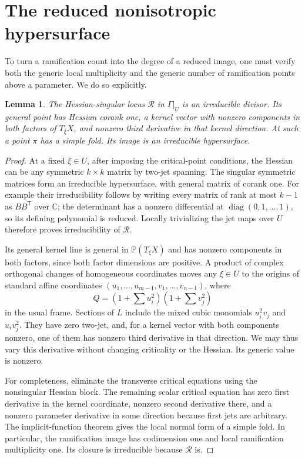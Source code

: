 \documentclass[11pt]{article}
\newtheorem{lemma}[theorem]{Lemma}
\newcommand{\C}{\mathbb C}
\newcommand{\PP}{\mathbb P}
\begin{document}
\section{The reduced nonisotropic hypersurface}
To turn a ramification count into the degree of a reduced image, one
must verify both the generic local multiplicity and the generic
number of ramification points above a parameter. We do so explicitly.

\begin{lemma}\label{lem:ordinary}
The Hessian-singular locus $\mathcal R$ in $\Gamma|_U$ is an irreducible
divisor. Its general point has Hessian corank one, a kernel vector
with nonzero components in both factors of $T_\xi X$, and nonzero
third derivative in that kernel direction. At such a point $\pi$
has a simple fold. Its image is an irreducible hypersurface.
\end{lemma}
\begin{proof}
At a fixed $\xi\in U$, after imposing the critical-point conditions,
the Hessian can be any symmetric $k\times k$ matrix by two-jet
spanning. The singular symmetric matrices form an irreducible
hypersurface, with general matrix of corank one. For example their
irreducibility follows by writing every matrix of rank at most
$k-1$ as $BB^{\mathsf T}$ over $\C$; the determinant has a nonzero
differential at $\operatorname{diag}(0,1,\ldots,1)$, so its defining
polynomial is reduced. Locally trivializing the jet maps over $U$
therefore proves irreducibility of $\mathcal R$.

Its general kernel line is general in $\PP(T_\xi X)$ and has nonzero
components in both factors, since both factor dimensions are
positive. A product of complex orthogonal changes of homogeneous
coordinates moves any $\xi\in U$ to the origins of standard affine
coordinates $(u_1,\ldots,u_{m-1},v_1,\ldots,v_{n-1})$, where
\[
 Q=(1+\textstyle\sum u_i^2)(1+\textstyle\sum v_j^2)
\]
in the usual frame. Sections of $L$ include the mixed cubic monomials
$u_i^2v_j$ and $u_iv_j^2$. They have zero two-jet, and, for a kernel
vector with both components nonzero, one of them has nonzero third
derivative in that direction. We may thus vary this derivative
without changing criticality or the Hessian. Its generic value is
nonzero.

For completeness, eliminate the transverse critical equations using
the nonsingular Hessian block. The remaining scalar critical equation
has zero first derivative in the kernel coordinate, nonzero second
derivative there, and a nonzero parameter derivative in some
direction because first jets are arbitrary. The implicit-function
theorem gives the local normal form of a simple fold. In particular,
the ramification image has codimension one and local ramification
multiplicity one. Its closure is irreducible because $\mathcal R$ is.
\end{proof}
\end{document}
